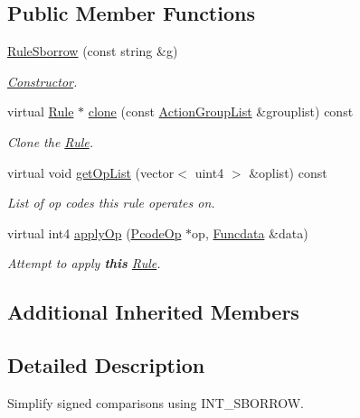 \subsection*{Public Member Functions}
\begin{DoxyCompactItemize}
\item 
\mbox{\hyperlink{class_rule_sborrow_a02d96329d57e19d62f5db86e90254cac}{Rule\+Sborrow}} (const string \&g)
\begin{DoxyCompactList}\small\item\em \mbox{\hyperlink{class_constructor}{Constructor}}. \end{DoxyCompactList}\item 
virtual \mbox{\hyperlink{class_rule}{Rule}} $\ast$ \mbox{\hyperlink{class_rule_sborrow_a25117849635c9e96434c3a054129d18b}{clone}} (const \mbox{\hyperlink{class_action_group_list}{Action\+Group\+List}} \&grouplist) const
\begin{DoxyCompactList}\small\item\em Clone the \mbox{\hyperlink{class_rule}{Rule}}. \end{DoxyCompactList}\item 
virtual void \mbox{\hyperlink{class_rule_sborrow_a8ba2b2878ddae189783562e0225656a4}{get\+Op\+List}} (vector$<$ uint4 $>$ \&oplist) const
\begin{DoxyCompactList}\small\item\em List of op codes this rule operates on. \end{DoxyCompactList}\item 
virtual int4 \mbox{\hyperlink{class_rule_sborrow_a624c5e919a23a5fd208c810aef997c48}{apply\+Op}} (\mbox{\hyperlink{class_pcode_op}{Pcode\+Op}} $\ast$op, \mbox{\hyperlink{class_funcdata}{Funcdata}} \&data)
\begin{DoxyCompactList}\small\item\em Attempt to apply {\bfseries{this}} \mbox{\hyperlink{class_rule}{Rule}}. \end{DoxyCompactList}\end{DoxyCompactItemize}
\subsection*{Additional Inherited Members}


\subsection{Detailed Description}
Simplify signed comparisons using I\+N\+T\+\_\+\+S\+B\+O\+R\+R\+OW. 


